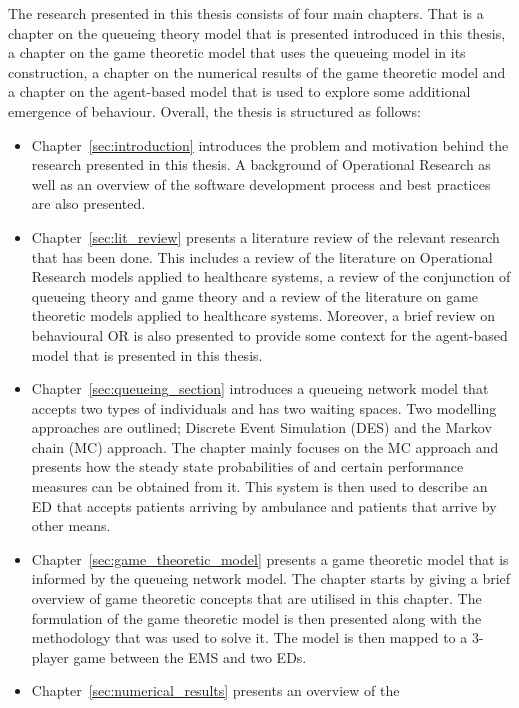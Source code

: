 The research presented in this thesis consists of four main chapters.
That is a chapter on the queueing theory model that is presented introduced
in this thesis, a chapter on the game theoretic model that uses the queueing
model in its construction, a chapter on the numerical results of the game
theoretic model and a chapter on the agent-based model that is used to
explore some additional emergence of behaviour.
Overall, the thesis is structured as follows:
\begin{itemize}
    \item Chapter~\ref{sec:introduction} introduces the problem and
    motivation behind the research presented in this thesis.
    A background of Operational Research as well as an overview of the
    software development process and best practices are also presented.
    \item Chapter~\ref{sec:lit_review} presents a literature review of the
    relevant research that has been done.
    This includes a review of the literature on Operational Research models
    applied to healthcare systems, a review of the conjunction of queueing
    theory and game theory and a review of the literature on game theoretic
    models applied to healthcare systems.
    Moreover, a brief review on behavioural OR is also presented to provide
    some context for the agent-based model that is presented in this thesis.
    \item Chapter~\ref{sec:queueing_section} introduces a queueing network
    model that accepts two types of individuals and has two waiting spaces.
    Two modelling approaches are outlined; Discrete Event Simulation (DES) and
    the Markov chain (MC) approach.
    The chapter mainly focuses on the MC approach and presents how the steady
    state probabilities of and certain performance measures can be obtained
    from it.
    This system is then used to describe an ED that accepts patients arriving
    by ambulance and patients that arrive by other means.
    \item Chapter~\ref{sec:game_theoretic_model} presents a game theoretic
    model that is informed by the queueing network model.
    The chapter starts by giving a brief overview of game theoretic concepts
    that are utilised in this chapter.
    The formulation of the game theoretic model is then presented along with
    the methodology that was used to solve it.
    The model is then mapped to a 3-player game between the EMS and two EDs.
    \item Chapter~\ref{sec:numerical_results} presents an overview of the

\end{itemize}
